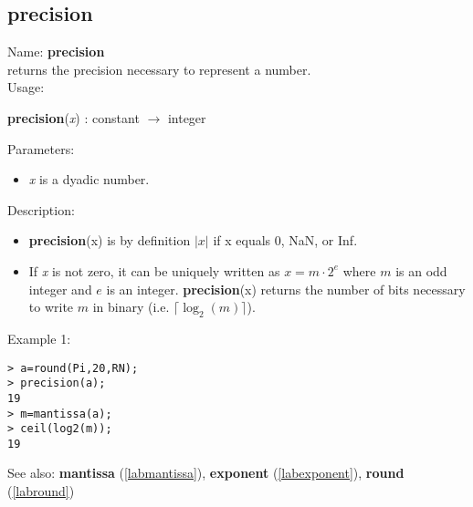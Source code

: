 \subsection{precision}
\label{labprecision}
\noindent Name: \textbf{precision}\\
returns the precision necessary to represent a number.\\
\noindent Usage: 
\begin{center}
\textbf{precision}(\emph{x}) : \textsf{constant} $\rightarrow$ \textsf{integer}\\
\end{center}
Parameters: 
\begin{itemize}
\item \emph{x} is a dyadic number.
\end{itemize}
\noindent Description: \begin{itemize}

\item \textbf{precision}(x) is by definition $\vert x \vert$ if x equals 0, NaN, or Inf.

\item If \emph{x} is not zero, it can be uniquely written as $x = m \cdot 2^e$ where
   $m$ is an odd integer and $e$ is an integer. \textbf{precision}(x) returns the number
   of bits necessary to write $m$ in binary (i.e. $\lceil \log_2(m) \rceil$).
\end{itemize}
\noindent Example 1: 
\begin{center}\begin{minipage}{15cm}\begin{Verbatim}[frame=single]
> a=round(Pi,20,RN);
> precision(a);
19
> m=mantissa(a);
> ceil(log2(m));
19
\end{Verbatim}
\end{minipage}\end{center}
See also: \textbf{mantissa} (\ref{labmantissa}), \textbf{exponent} (\ref{labexponent}), \textbf{round} (\ref{labround})
